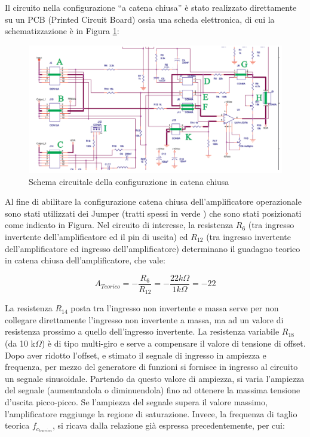 Il circuito nella configurazione “a catena chiusa” è stato realizzato direttamente su un PCB (Printed Circuit Board) ossia una scheda elettronica, di cui la schematizzazione è in Figura \ref{fig:schemaCatenaChiusa}:
\begin{figure}
    \centering
    \includegraphics[width=1\linewidth]{media/schemaCircuitaleuA741.png}
    \caption{Schema circuitale della configurazione in catena chiusa}
    \label{fig:schemaCatenaChiusa}
\end{figure}
\FloatBarrier
Al fine di abilitare la configurazione catena chiusa dell'amplificatore operazionale sono stati utilizzati dei Jumper (tratti spessi in verde ) che sono stati posizionati come indicato in Figura.
\FloatBarrier
Nel circuito di interesse, la resistenza \(R_6\) (tra ingresso invertente dell’amplificatore ed il pin di uscita) ed \(R_{12}\) (tra ingresso invertente dell’amplificatore ed ingresso dell’amplificatore) determinano il guadagno teorico in catena chiusa dell’amplificatore, che vale:

\[A_{Teorico}=-\frac{R_6}{R_{12}}=-\frac{22 k\Omega}{1 k\Omega}=-22\]

La resistenza \(R_{14}\) posta tra l’ingresso non invertente e massa serve per non collegare direttamente l’ingresso non invertente a massa, ma ad un valore di resistenza prossimo a quello dell’ingresso invertente. La resistenza variabile \(R_{18}\) (da 10 k\(\Omega\)) è di tipo multi-giro e serve a compensare il valore di tensione di offset. Dopo aver ridotto l’offset, e stimato il segnale di ingresso in ampiezza e frequenza, per mezzo del generatore di funzioni si fornisce in ingresso al circuito un segnale sinusoidale. Partendo da questo valore di ampiezza, si varia l’ampiezza del segnale (aumentandola o diminuendola) fino ad ottenere la massima tensione d’uscita picco-picco. Se l’ampiezza del segnale supera il valore massimo, l’amplificatore raggiunge la regione di saturazione.
Invece, la frequenza di taglio teorica \(f_{c_{teorica}}\), si ricava dalla relazione già espressa precedentemente, per cui:

